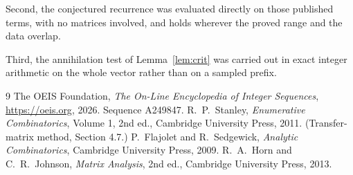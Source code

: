 \documentclass[11pt,a4paper]{article}
\theoremstyle{plain}
\theoremstyle{definition}
\begin{document}
Second, the conjectured recurrence was evaluated directly on those published terms, with no
matrices involved, and holds wherever the proved range and the data overlap.

Third, the annihilation test of Lemma~\ref{lem:crit} was carried out in exact integer
arithmetic on the whole vector rather than on a sampled prefix.

\begin{thebibliography}{9}
 The OEIS Foundation, \emph{The On-Line Encyclopedia of Integer
Sequences}, \url{https://oeis.org}, 2026. Sequence A249847.
 R.~P.~Stanley, \emph{Enumerative Combinatorics}, Volume 1, 2nd ed.,
Cambridge University Press, 2011. (Transfer-matrix method, Section 4.7.)
 P.~Flajolet and R.~Sedgewick, \emph{Analytic Combinatorics}, Cambridge
University Press, 2009.
 R.~A.~Horn and C.~R.~Johnson, \emph{Matrix Analysis}, 2nd ed., Cambridge
University Press, 2013.
\end{thebibliography}
\end{document}
